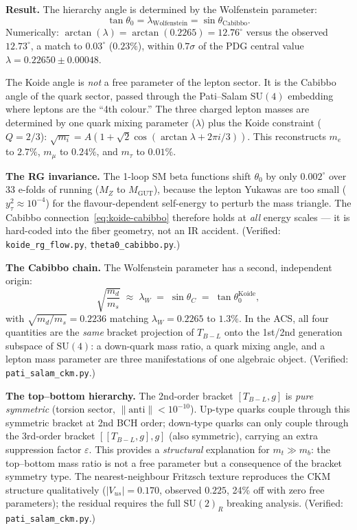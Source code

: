 \documentclass[11pt,a4paper]{article}
\theoremstyle{plain}
\theoremstyle{definition}
\theoremstyle{remark}
\begin{document}
\textbf{Result.}
The hierarchy angle is determined by the Wolfenstein parameter:
\begin{equation}\label{eq:koide-cabibbo}
  \tan\theta_0 = \lambda_{\mathrm{Wolfenstein}} = \sin\theta_{\mathrm{Cabibbo}}.
\end{equation}
Numerically: $\arctan(\lambda) = \arctan(0.2265) = 12.76^\circ$ versus
the observed $12.73^\circ$, a match to $0.03^\circ$ ($0.23\%$), within
$0.7\sigma$ of the PDG central value $\lambda = 0.22650 \pm 0.00048$.

The Koide angle is \emph{not} a free parameter of the lepton sector.
It is the Cabibbo angle of the quark sector, passed through the
Pati--Salam $\mathrm{SU}(4)$ embedding where leptons are the ``4th colour.''
The three charged lepton masses are determined by one quark mixing
parameter ($\lambda$) plus the Koide constraint ($Q = 2/3$):
$\sqrt{m_i} = A(1 + \sqrt{2}\cos(\arctan\lambda + 2\pi i/3))$.
This reconstructs $m_e$ to $2.7\%$, $m_\mu$ to $0.24\%$, and
$m_\tau$ to $0.01\%$.

\textbf{The RG invariance.}
The 1-loop SM beta functions shift $\theta_0$ by only $0.002^\circ$
over 33 e-folds of running ($M_Z$ to $M_{\mathrm{GUT}}$), because
the lepton Yukawas are too small ($y_\tau^2 \approx 10^{-4}$) for
the flavour-dependent self-energy to perturb the mass triangle.
The Cabibbo connection~\eqref{eq:koide-cabibbo} therefore holds at
\emph{all} energy scales --- it is hard-coded into the fiber geometry,
not an IR accident.
(Verified: \texttt{koide\_rg\_flow.py}, \texttt{theta0\_cabibbo.py}.)

\textbf{The Cabibbo chain.}
The Wolfenstein parameter has a second, independent origin:
\begin{equation}\label{eq:cabibbo-chain}
  \sqrt{\frac{m_d}{m_s}} \;\approx\; \lambda_W \;=\; \sin\theta_C
  \;=\; \tan\theta_0^{\mathrm{Koide}},
\end{equation}
with $\sqrt{m_d/m_s} = 0.2236$ matching $\lambda_W = 0.2265$
to $1.3\%$.  In the ACS, all four quantities are the \emph{same}
bracket projection of $T_{B{-}L}$ onto the 1st/2nd generation
subspace of $\mathrm{SU}(4)$: a down-quark mass ratio, a quark mixing
angle, and a lepton mass parameter are three manifestations of one
algebraic object.
(Verified: \texttt{pati\_salam\_ckm.py}.)

\textbf{The top--bottom hierarchy.}
The 2nd-order bracket $[T_{B{-}L}, g]$ is \emph{pure symmetric}
(torsion sector, $\|\mathrm{anti}\| < 10^{-10}$).
Up-type quarks couple through this symmetric bracket at 2nd BCH
order; down-type quarks can only couple through the 3rd-order bracket
$[[T_{B{-}L},g],g]$ (also symmetric), carrying an extra suppression
factor $\varepsilon$.  This provides a \emph{structural} explanation
for $m_t \gg m_b$: the top--bottom mass ratio is not a free parameter
but a consequence of the bracket symmetry type.
The nearest-neighbour Fritzsch texture reproduces the CKM structure
qualitatively ($|V_{us}| = 0.170$, observed $0.225$, 24\% off with
zero free parameters); the residual requires the full
$\mathrm{SU}(2)_R$ breaking analysis.
(Verified: \texttt{pati\_salam\_ckm.py}.)
\end{document}
